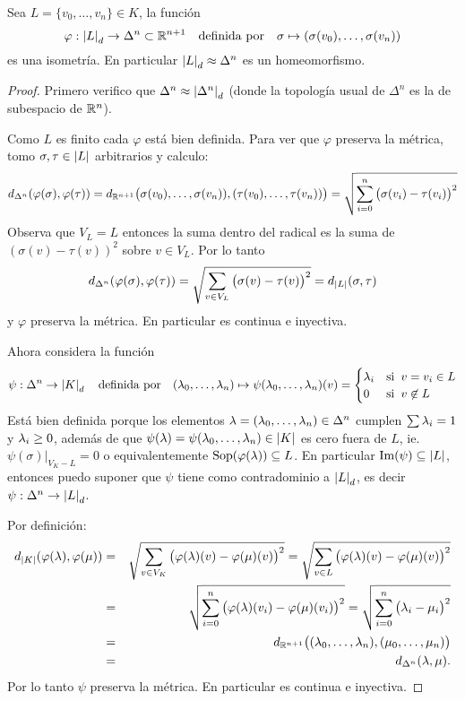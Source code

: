 \begin{ejercicio}\label{ej:49}
  Sea $L=\{v_0,\ldots,v_n\}\in K$, la funci\'on
  \[
    \varphi:\left| L \right|_d\rightarrow\Delta^n\subset\mathbb{R}^{n+1} \quad\text{definida por}\quad
    \sigma \mapsto (\sigma(v_0),\ldots,\sigma(v_n))
  \]
  es una isometr\'ia. En particular $\left| L \right|_d\approx\Delta^n$ es un homeomorfismo.
\end{ejercicio}
\begin{proof}%
  Primero verifico que $\Delta^n\approx\left| \Delta^n \right|_d$ (donde la topolog\'ia usual de $\Delta^n$
  es la de subespacio de $\mathbb{R}^n$).
  
  Como $L$ es finito cada $\varphi$ est\'a bien definida. Para ver que $\varphi$ preserva
  la m\'etrica, tomo $\sigma,\tau\in\left| L \right|$ arbitrarios y calculo:
  \[
    d_{\Delta^n}(\varphi(\sigma),\varphi(\tau))=
    d_{\mathbb{R}^{n+1}}\big(\sigma(v_0),\ldots,\sigma(v_n)),(\tau(v_0),\ldots,\tau(v_n))\big)=
    \sqrt{\sum_{i=0}^n \big(\sigma(v_i)-\tau(v_i)\big)^2}
  \]
  Observa que $V_L=L$ entonces la suma dentro del radical es la suma de $(\sigma(v)-\tau(v))^2$
  sobre $v\in V_L$. Por lo tanto
  \[
    d_{\Delta^n}(\varphi(\sigma),\varphi(\tau))=
    \sqrt{\sum_{v\in V_L}\big(\sigma(v)-\tau(v)\big)^2}=
    d_{\left| L \right|}(\sigma,\tau)
  \]
  y $\varphi$ preserva la m\'etrica. En particular es continua e inyectiva.

  Ahora considera la funci\'on
  \[
    \psi:\Delta^n\rightarrow\left| K \right|_d \quad\text{definida por}\quad
    (\lambda_0,\ldots,\lambda_n) \mapsto \psi(\lambda_0,\ldots,\lambda_n)(v)=
    \begin{cases}
      \lambda_i &\text{si}\;\; v=v_i\in L \\
      0 &\text{si}\;\; v\not\in L
    \end{cases}
  \]
  Est\'a bien definida porque los elementos $\lambda=(\lambda_0,\ldots,\lambda_n)\in\Delta^n$ cumplen
  $\sum\lambda_i=1$ y $\lambda_i\geq 0$, adem\'as de que $\psi(\lambda)=\psi(\lambda_0,\ldots,\lambda_n)\in\left| K \right|$
  es cero fuera de $L$, ie. $\psi(\sigma)|_{V_K-L}=0$ o equivalentemente
  $\text{Sop}(\varphi(\lambda))\subseteq L$. En particular $\text{Im}(\psi)\subseteq\left| L \right|$, entonces
  puedo suponer que $\psi$ tiene como contradominio a $\left| L \right|_d$, es decir $\psi:\Delta^n\rightarrow\left| L \right|_d$.

  Por definici\'on:
  \begin{eqnarray*}
    d_{\left| K \right|}(\varphi(\lambda),\varphi(\mu)) & = &
    \sqrt{\sum_{v\in V_K}\big(\varphi(\lambda)(v)-\varphi(\mu)(v) \big)^2}=
    \sqrt{\sum_{v\in L}\big(\varphi(\lambda)(v)-\varphi(\mu)(v) \big)^2} \\ & = &
    \sqrt{\sum_{i=0}^n\big(\varphi(\lambda)(v_i)-\varphi(\mu)(v_i) \big)^2}=
    \sqrt{\sum_{i=0}^n\big(\lambda_i-\mu_i \big)^2} \\ &=&
    d_{\mathbb{R}^{n+1}}\big((\lambda_0,\ldots,\lambda_n),(\mu_0,\ldots,\mu_n) \big) \\ &=&
    d_{\Delta^n}(\lambda,\mu).
  \end{eqnarray*}
  Por lo tanto $\psi$ preserva la m\'etrica. En particular es continua e inyectiva.
 

\end{proof}
